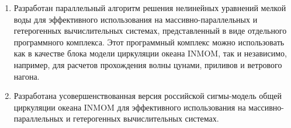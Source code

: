 \begin{enumerate}[beginpenalty=10000] %
    \item Разработан параллельный алгоритм решения нелинейных уравнений мелкой воды для эффективного использования на массивно-параллельных и гетерогенных вычислительных системах, представленный в виде отдельного программного комплекса. Этот программный комплекс можно использовать как в качестве блока модели циркуляции океана INMOM, так и независимо, например, для расчетов прохождения волны цунами, приливов и ветрового нагона.
    \item Разработана усовершенствованная версия российской сигмы-модель общей циркуляции океана INMOM для эффективного использования на массивно-параллельных и гетерогенных вычислительных системах.
\end{enumerate}









